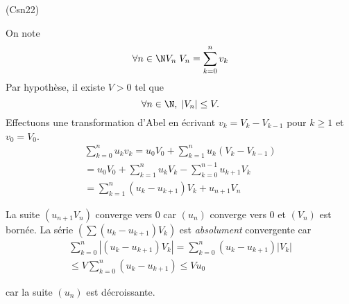 \begin{tiny}(Csn22)\end{tiny} On note 
\begin{displaymath}
 \forall n\in \N V_n\; V_n = \sum_{k=0}^n v_k
\end{displaymath}
Par hypothèse, il existe $V>0$ tel que 
\begin{displaymath}
 \forall n \in \N,\; |V_n| \leq V.
\end{displaymath}
Effectuons une transformation d'Abel en écrivant $v_k = V_k - V_{k-1}$ pour $k\geq 1$ et $v_0 = V_0$.
\begin{multline*}
 \sum_{k=0}^n u_kv_k
= u_0 V_0 + \sum_{k=1}^n u_k(V_k - V_{k-1})\\
= u_0 V_0 + \sum_{k=1}^n u_kV_k - \sum_{k=0}^{n-1} u_{k+1}V_{k}\\
= \sum_{k=1}^n (u_k-u_{k+1})V_k +u_{n+1}V_n
\end{multline*}

La suite $(u_{n+1}V_n)$ converge vers $0$ car $(u_n)$ converge vers $0$ et $(V_n)$ est bornée. La série
$\left( \sum (u_k-u_{k+1})V_k\right)$ est \emph{absolument} convergente car
\begin{multline*}
 \sum_{k=0}^n \left|(u_k-u_{k+1})V_k\right| 
= \sum_{k=0}^n (u_k-u_{k+1})\left|V_k\right| \\
\leq V \sum_{k=0}^n (u_k-u_{k+1})
\leq Vu_0
\end{multline*}

car la suite $(u_n)$ est décroissante.
